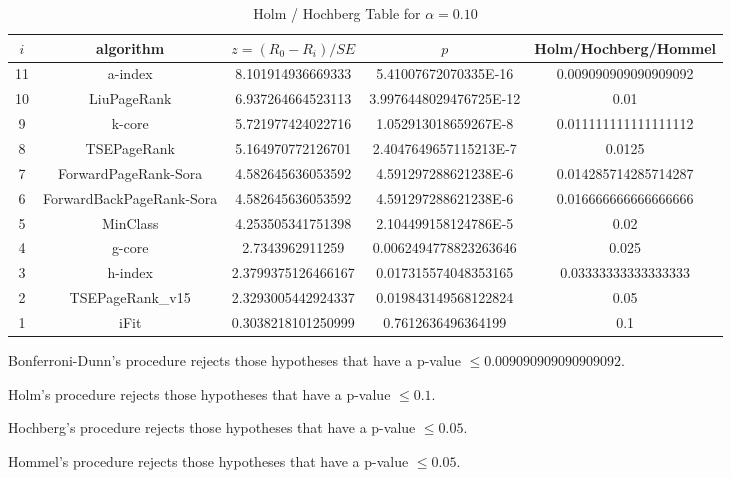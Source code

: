 \documentclass[a4paper,10pt]{article}
\begin{document}
\begin{landscape}
\begin{table}[!htp]
\centering\tiny
\caption{Holm / Hochberg Table for $\alpha=0.10$}
\begin{tabular}{ccccc}
$i$&algorithm&$z=(R_0 - R_i)/SE$&$p$&Holm/Hochberg/Hommel\\
\hline
11&a-index&8.101914936669333&5.41007672070335E-16&0.009090909090909092\\
10&LiuPageRank&6.937264664523113&3.9976448029476725E-12&0.01\\
9&k-core&5.721977424022716&1.052913018659267E-8&0.011111111111111112\\
8&TSEPageRank&5.164970772126701&2.4047649657115213E-7&0.0125\\
7&ForwardPageRank-Sora&4.582645636053592&4.591297288621238E-6&0.014285714285714287\\
6&ForwardBackPageRank-Sora&4.582645636053592&4.591297288621238E-6&0.016666666666666666\\
5&MinClass&4.253505341751398&2.104499158124786E-5&0.02\\
4&g-core&2.7343962911259&0.0062494778823263646&0.025\\
3&h-index&2.3799375126466167&0.017315574048353165&0.03333333333333333\\
2&TSEPageRank_v15&2.3293005442924337&0.019843149568122824&0.05\\
1&iFit&0.3038218101250999&0.7612636496364199&0.1\\
\hline
\end{tabular}
\end{table}
Bonferroni-Dunn's procedure rejects those hypotheses that have a p-value $\le0.009090909090909092$.


Holm's procedure rejects those hypotheses that have a p-value $\le0.1$.


Hochberg's procedure rejects those hypotheses that have a p-value $\le0.05$.


Hommel's procedure rejects those hypotheses that have a p-value $\le0.05$.



\end{landscape}
\end{document}
